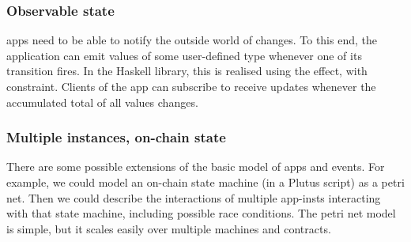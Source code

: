 \subsubsection{Observable state}

\glspl{app} need to be able to notify the outside world of changes.
To this end, the application can emit values of some user-defined type  whenever one of its transition fires.
In the Haskell library, this is realised using the  effect, with  constraint.
Clients of the \gls{app} can subscribe to receive updates whenever the accumulated total of all values changes.

\subsubsection{Multiple instances, on-chain state}

There are some possible extensions of the basic model of apps and events.
For example, we could model an on-chain state machine (in a Plutus script) as a petri net.
Then we could describe the interactions of multiple \glspl{app-inst} interacting with that state machine, including possible race conditions.
The petri net model is simple, but it scales easily over multiple machines and contracts.
